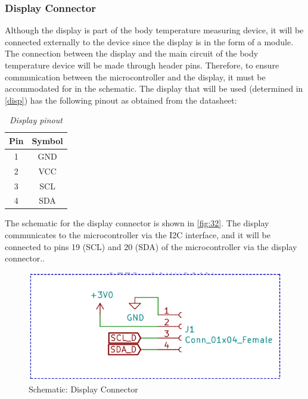 \subsubsection{Display Connector}
Although the display is part of the body temperature measuring device, it will be connected externally to the device since the display is in the form of a module. The connection between the display and the main circuit of the body temperature device will be made through header pins. Therefore, to ensure communication between the microcontroller and the display, it must be accommodated for in the schematic. The display that will be used (determined in \autoref{disp}) has the following pinout as obtained from the datasheet:
\begin{table}[H]
	\centering
	\caption{\textit{Display pinout}}
	\label{tab:4}
		\begin{tabular}{|c|c|}
		\hline
		\textbf{Pin} & \textbf{Symbol}\\
		\hline
		\hline
		1 & GND\\
		\hline
		2 & VCC\\
		\hline
		3 & SCL\\
		\hline
		4 & SDA\\
		\hline
	\end{tabular}
\end{table}
\noindent
The schematic for the display connector is shown in \autoref{fig:32}. The display communicates to the microcontroller via the I2C interface, and it will be connected to pins 19 (SCL) and 20 (SDA) of the microcontroller via the display connector..
\begin{figure}[H]
	\centering
	\includegraphics[scale=0.6]{img/Schematic_Disp}
	\caption{Schematic: Display Connector}
	\label{fig:32}
\end{figure}
